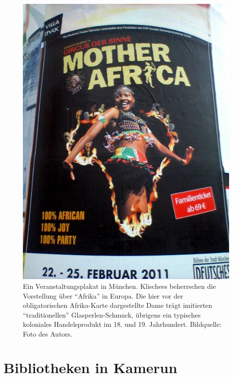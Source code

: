 \documentclass[a4paper,
fontsize=11pt,
oneside,
numbers=noperiodatend,
parskip=half-,
bibliography=totoc,
final
]{scrartcl}
\begin{document}
\begin{figure}[htbp]
\centering
\includegraphics{img/Klischee.jpg}
\caption{Ein Veranstaltungsplakat in München. Klischees beherrschen die
Vorstellung über \enquote{Afrika} in Europa. Die hier vor der
obligatorischen Afrika-Karte dargestellte Dame trägt imitierten
\enquote{traditionellen} Glasperlen-Schmuck, übrigens ein typisches
koloniales Handelsprodukt im 18. und 19. Jahrhundert. Bildquelle: Foto
des Autors.}
\end{figure}

\section*{Bibliotheken in Kamerun}\label{bibliotheken-in-kamerun}
\end{document}
